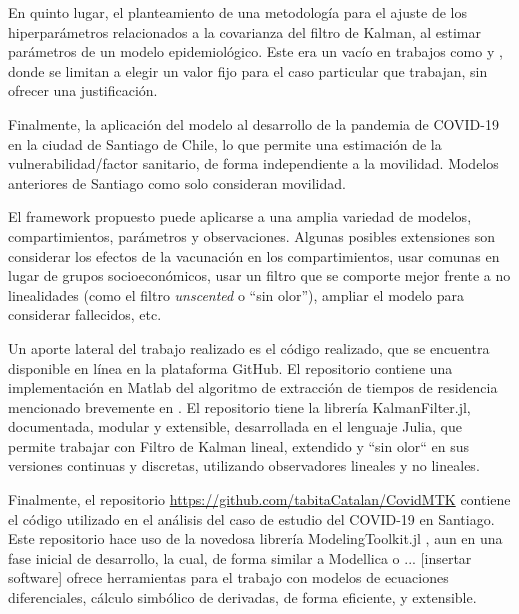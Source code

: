\begin{conclusion}
En quinto lugar, el planteamiento de una metodología para el ajuste de los hiperparámetros relacionados a la covarianza del filtro de Kalman, al estimar parámetros de un modelo epidemiológico. Este era un vacío en trabajos como \cite{Hasan2020} y \cite{Sameni2020}, donde se limitan a elegir un valor fijo para el caso particular que trabajan, sin ofrecer una justificación.

Finalmente, la aplicación del modelo al desarrollo de la pandemia de COVID-19 en la ciudad de Santiago de Chile, lo que permite una estimación de la vulnerabilidad/factor sanitario, de forma independiente a la movilidad. Modelos anteriores de Santiago como \cite{Gozzi2021} solo consideran movilidad.


El framework propuesto puede aplicarse a una amplia variedad de modelos, compartimientos, parámetros y observaciones. Algunas posibles extensiones son considerar los efectos de la vacunación en los compartimientos, usar comunas en lugar de grupos socioeconómicos, usar un filtro que se comporte mejor frente a no linealidades (como el filtro \textit{unscented} o ``sin olor''), ampliar el modelo para considerar fallecidos, etc.

Un aporte lateral del trabajo realizado es el código realizado, que se encuentra disponible en línea en la plataforma GitHub. El repositorio \url{} contiene una implementación en Matlab del algoritmo de extracción de tiempos de residencia mencionado brevemente en \cite{Munizaga2011}. El repositorio \url{} tiene la librería KalmanFilter.jl, documentada, modular y extensible, desarrollada en el lenguaje Julia, que permite trabajar con Filtro de Kalman lineal, extendido y ``sin olor`` en sus versiones continuas y discretas, utilizando observadores lineales y no lineales.

Finalmente, el repositorio \url{https://github.com/tabitaCatalan/CovidMTK} contiene el código utilizado en el análisis del caso de estudio del COVID-19 en Santiago. Este repositorio hace uso de la novedosa librería ModelingToolkit.jl \cite{ma2021modelingtoolkit}, aun en una fase inicial de desarrollo, la cual, de forma similar a Modellica o ... [insertar software] ofrece herramientas para el trabajo con modelos de ecuaciones diferenciales, cálculo simbólico de derivadas, de forma eficiente, y extensible.



\end{conclusion}